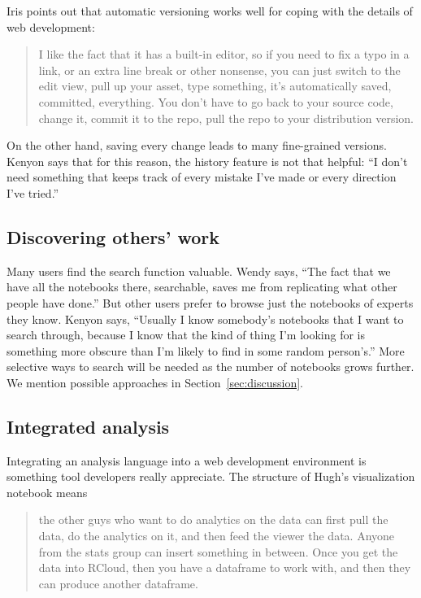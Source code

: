 
Iris points out that automatic versioning works well for coping with
the details of web development:
\begin{quote}
I like the fact that it has a built-in editor, so
if you need to fix a typo in a link, or an extra line break or other
nonsense, you can just switch to the edit view, pull up your asset, type
something, it's automatically saved, committed, everything. You don't have to go
back to your source code, change it, commit it to the repo, pull the repo to
your distribution version. 
\end{quote}

On the other hand, saving every change leads to many fine-grained
versions. Kenyon says that for this reason, the history feature is not that
helpful: ``I don't need something that keeps track of every mistake I've made or
every direction I've tried.''

\subsection{Discovering others' work}
Many users find the search function valuable. Wendy says, ``The fact that we have
all the notebooks there, searchable, saves me from replicating what other people
have done.''
But other users prefer to browse just the notebooks of experts they
know. Kenyon says, ``Usually I know somebody's notebooks that I want to search
through, because I know that the kind of thing I'm looking for is something
more obscure than I'm likely to find in some random person's.''
More selective ways to search will be needed as the number of notebooks
grows further. We mention possible approaches in Section~\ref{sec:discussion}.

\subsection{Integrated analysis}
Integrating an analysis language into a web development environment is something
tool developers really appreciate. The structure of Hugh's visualization
notebook means
\begin{quote}
the other guys who want to do analytics on the data can first pull
the data, do the analytics on it, and then feed the viewer the data.
Anyone from the stats group can insert something in between.
Once you get the data into RCloud, then you have a dataframe
to work with, and then they can produce another dataframe.
\end{quote}

